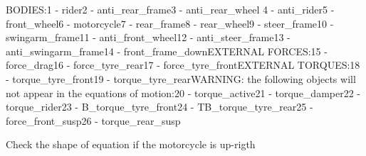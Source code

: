 \documentclass{article}
\begin{document}
\begin{maplegroup}
\begin{mapleinput}
\end{mapleinput}
\mapleresult
BODIES:1 - rider2 - anti\_rear\_frame3 - anti\_rear\_wheel
4 - anti\_rider5 - front\_wheel6 - motorcycle7 - rear\_frame8 - rear\_wheel9 - steer\_frame10 - swingarm\_frame11 - anti\_front\_wheel12 - anti\_steer\_frame13 - anti\_swingarm\_frame14 - front\_frame\_downEXTERNAL FORCES:15 - force\_drag16 - force\_tyre\_rear17 - force\_tyre\_frontEXTERNAL TORQUES:18 - torque\_tyre\_front19 - torque\_tyre\_rearWARNING: the following objects will not appear in the equations of motion:20 - torque\_active21 - torque\_damper22 - torque\_rider23 - B\_torque\_tyre\_front24 - TB\_torque\_tyre\_rear25 - force\_front\_susp26 - torque\_rear\_susp\mapleresult
\begin{maplelatex}
\end{maplelatex}
\end{maplegroup}
\begin{maplegroup}
\begin{mapleinput}
\end{mapleinput}
\end{maplegroup}
\begin{maplegroup}
\begin{Maple Normal}{
Check the shape of equation if the motorcycle is up-rigth}\end{Maple Normal}

\end{maplegroup}
\begin{maplegroup}
\begin{mapleinput}
\end{mapleinput}
\mapleresult
\begin{maplelatex}
\end{maplelatex}
\end{maplegroup}
\end{document}
